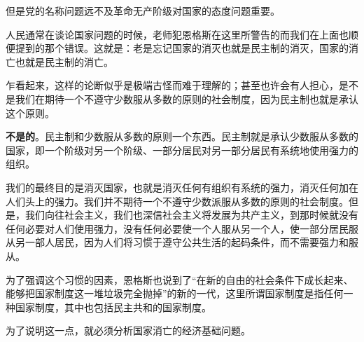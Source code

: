 但是党的名称问题远不及革命无产阶级对国家的态度问题重要。

人民通常在谈论国家问题的时候，老师犯恩格斯在这里所警告的而我们在上面也顺便提到的那个错误。这就是：{\heiti 老是忘记国家的消灭也就是民主制的消灭，国家的消亡也就是民主制的消亡}。

乍看起来，这样的论断似乎是极端古怪而难于理解的；甚至也许会有人担心，是不是我们在期待一个不遵守少数服从多数的原则的社会制度，因为民主制也就是承认这个原则。

\textbf{不是的}。民主制和少数服从多数的原则一个东西。民主制就是承认少数服从多数的{\kaishu 国家}，即一个阶级对另一个阶级、一部分居民对另一部分居民有系统地使用{\kaishu 强力}的组织。

我们的最终目的是消灭国家，也就是消灭任何有组织有系统的强力，消灭任何加在人们头上的强力。我们并不期待一个不遵守少数派服从多数的原则的社会制度。但是，我们向往社会主义，我们也深信社会主义将发展为共产主义，到那时候就没有任何必要对人们使用强力，没有任何必要使一个人{\kaishu 服从}另一个人，使一部分居民{\kaishu 服从}另一部人居民，因为人们将{\kaishu 习惯于}遵守公共生活的起码条件，而{\kaishu 不需要强力}和{\kaishu 服从}。

为了强调这个习惯的因素，恩格斯也说到了“在新的自由的社会条件下成长起来、能够把国家制度这一堆垃圾完全抛掉”的新的一代，这里所谓国家制度是指任何一种国家制度，其中也包括民主共和的国家制度。

为了说明这一点，就必须分析国家消亡的经济基础问题。
